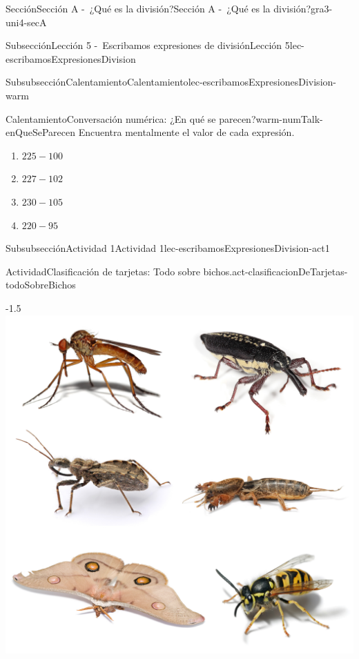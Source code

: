 \documentclass[twoside,10pt,]{article}
\begin{document}
\begin{sectionptx}{Sección}{Sección A -~¿Qué es la división?}{}{Sección A -~¿Qué es la división?}{}{}{gra3-uni4-secA}
\begin{subsectionptx}{Subsección}{Lección 5 -~Escribamos expresiones de división}{}{Lección 5}{}{}{lec-escribamosExpresionesDivision}
%
\begin{subsubsectionptx}{Subsubsección}{Calentamiento}{}{Calentamiento}{}{}{lec-escribamosExpresionesDivision-warm}
\begin{exploration}{Calentamiento}{Conversación numérica: ¿En qué se parecen?}{warm-numTalk-enQueSeParecen}%
Encuentra mentalmente el valor de cada expresión.%
\par
%
\begin{enumerate}[label={\Alph*.}]
\item{}\(\displaystyle 225 - 100\)%
\item{}\(\displaystyle 227 - 102\)%
\item{}\(\displaystyle 230 - 105\)%
\item{}\(\displaystyle 220 - 95\)%
\end{enumerate}
%
\end{exploration}%
\end{subsubsectionptx}
%
%
\typeout{************************************************}
\typeout{************************************************}
%
\begin{subsubsectionptx}{Subsubsección}{Actividad 1}{}{Actividad 1}{}{}{lec-escribamosExpresionesDivision-act1}
\begin{activity}{Actividad}{Clasificación de tarjetas: Todo sobre bichos.}{act-clasificacionDeTarjetas-todoSobreBichos}%
\begin{image}{0.3}{0.4}{0.3}{-1.5\baselineskip}%
\includegraphics[width=\linewidth]{external/png-source/v1 3.4.A5 Launch.png}

\end{image}
\end{activity}
\end{subsubsectionptx}
\end{subsectionptx}
\end{sectionptx}
\end{document}
